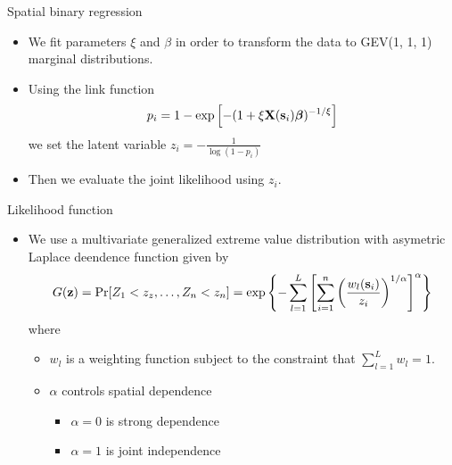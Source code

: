 \documentclass{beamer}
\begin{document}
\begin{frame}{Spatial binary regression}
  \begin{itemize} \setlength{\itemsep}{0.5em}
    \item We fit parameters $\xi$ and $\beta$ in order to transform the data to GEV(1, 1, 1) marginal distributions.
    \item Using the link function
    \begin{align*}
      p_i = 1 - \exp \left[-(1 + \xi \mbox{\bf X}(\mbox{\bf s}_i) \mbox{\boldmath $\beta$})^{-1/\xi}\right]
    \end{align*}
    we set the latent variable $z_i = -\frac{1}{\log(1 - p_i)}$
    \item Then we evaluate the joint likelihood using $z_i$.
  \end{itemize}
\end{frame}

\begin{frame}{Likelihood function}
  \begin{itemize} \setlength{\itemsep}{0.5em}
    \item We use a multivariate generalized extreme value distribution with asymetric Laplace deendence function given by
    \footnotesize{
    \begin{align*}
      G(\mbox{\bf z}) = \Pr[Z_1 < z_z, \ldots, Z_n < z_n] = \exp\left\{ - \sum_{l = 1}^{L} \left[ \sum_{i = 1}^n \left( \frac{ w_l(\mbox{\bf s}_i) }{ z_i } \right)^{ 1 / \alpha} \right]^\alpha \right\}
    \end{align*}
    }
    where
    \begin{itemize}
      \item $w_l$ is a weighting function subject to the constraint that $\sum_{l = 1}^L w_l = 1$.
      \item $\alpha$ controls spatial dependence
      \begin{itemize}
        \item $\alpha = 0$ is strong dependence
        \item $\alpha = 1$ is joint independence
      \end{itemize}
    \end{itemize}
  \end{itemize}
\end{frame}
\end{document}
